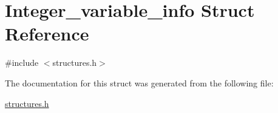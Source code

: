 \hypertarget{structInteger__variable__info}{}\section{Integer\+\_\+variable\+\_\+info Struct Reference}
\label{structInteger__variable__info}


{\ttfamily \#include $<$structures.\+h$>$}



The documentation for this struct was generated from the following file\+:\begin{DoxyCompactItemize}
\item 
\hyperlink{structures_8h}{structures.\+h}\end{DoxyCompactItemize}

